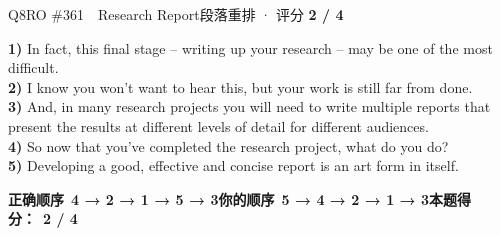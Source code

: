 \begin{qblock}{Q8\quad RO \#361\ \ Research Report}{段落重排 · 评分 \textcolor{cAccent}{\bfseries 2 / 4}}
\begin{promptbox}
\textbf{1)} In fact, this final stage -- writing up your research -- may be one of the most difficult.\\
\textbf{2)} I know you won't want to hear this, but your work is still far from done.\\
\textbf{3)} And, in many research projects you will need to write multiple reports that present the results at different levels of detail for different audiences.\\
\textbf{4)} So now that you've completed the research project, what do you do?\\
\textbf{5)} Developing a good, effective and concise report is an art form in itself.
\end{promptbox}
\smallskip
\textbf{正确顺序}\ \textcolor{cFix}{\bfseries 4 → 2 → 1 → 5 → 3}\qquad\textbf{你的顺序}\ {\color{cWrong}\bfseries 5 → 4 → 2 → 1 → 3}\qquad\textbf{本题得分：}\ {\color{cAccent}\bfseries 2 / 4}
\end{qblock}

